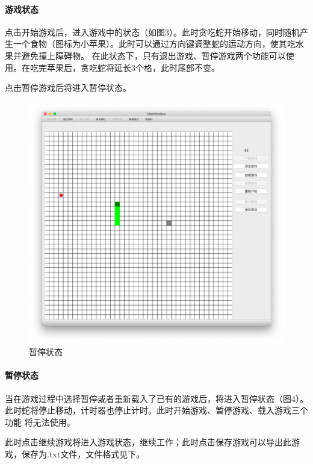 \documentclass[utf-8]{ctexart}
\begin{document}
    \paragraph{游戏状态} 点击开始游戏后，进入游戏中的状态（如图3）。此时贪吃蛇开始移动，同时随机产生一个食物（图标为小苹果）。此时可以通过方向键调整蛇的运动方向，使其吃水果并避免撞上障碍物。
    在此状态下，只有退出游戏、暂停游戏两个功能可以使用。在吃完苹果后，贪吃蛇将延长3个格，此时尾部不变。
    \par 点击暂停游戏后将进入暂停状态。

    \begin{figure}[H]
        \centering
        \includegraphics[scale = 0.2]{texsrc/界面paused.png}
        \caption{暂停状态}
        \label{paused}
    \end{figure}
    \paragraph{暂停状态} 当在游戏过程中选择暂停或者重新载入了已有的游戏后，将进入暂停状态（图4）。此时蛇将停止移动，计时器也停止计时。此时开始游戏、暂停游戏、载入游戏三个功能
    将无法使用。
    \par 此时点击继续游戏将进入游戏状态，继续工作；此时点击保存游戏可以导出此游戏，保存为.txt文件，文件格式见下。
\end{document}
